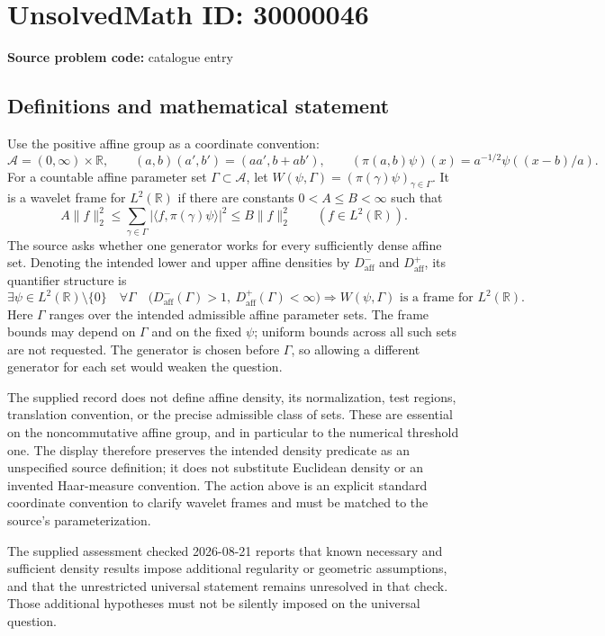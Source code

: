 \documentclass[11pt]{article}
\newcommand{\R}{\mathbb{R}}
\begin{document}
\section*{UnsolvedMath ID: 30000046}
\textbf{Source problem code:} catalogue entry
\subsection{Definitions and mathematical statement}
Use the positive affine group as a coordinate convention:
\[
\mathcal A=(0,\infty)\times\R,\qquad
(a,b)(a',b')=(aa',b+ab'),\qquad
(\pi(a,b)\psi)(x)=a^{-1/2}\psi((x-b)/a).
\]
For a countable affine parameter set \(\Gamma\subset\mathcal A\), let
\(W(\psi,\Gamma)=(\pi(\gamma)\psi)_{\gamma\in\Gamma}\).
It is a wavelet frame for \(L^2(\R)\) if there are constants \(0<A\leq B<\infty\) such that
\[
A\|f\|_2^2\leq\sum_{\gamma\in\Gamma}|\langle f,\pi(\gamma)\psi\rangle|^2
\leq B\|f\|_2^2\qquad(f\in L^2(\R)).
\]
The source asks whether one generator works for every sufficiently dense affine set. Denoting the intended lower and upper affine densities by \(D^-_{\mathrm{aff}}\) and \(D^+_{\mathrm{aff}}\), its quantifier structure is
\[
\exists\psi\in L^2(\R)\setminus\{0\}\quad
\forall\Gamma\quad
\bigl(D^-_{\mathrm{aff}}(\Gamma)>1,\ D^+_{\mathrm{aff}}(\Gamma)<\infty\bigr)
\Longrightarrow W(\psi,\Gamma)\text{ is a frame for }L^2(\R).
\]
Here \(\Gamma\) ranges over the intended admissible affine parameter sets. The frame bounds may depend on \(\Gamma\) and on the fixed \(\psi\); uniform bounds across all such sets are not requested. The generator is chosen before \(\Gamma\), so allowing a different generator for each set would weaken the question.

The supplied record does not define affine density, its normalization, test regions, translation convention, or the precise admissible class of sets. These are essential on the noncommutative affine group, and in particular to the numerical threshold one. The display therefore preserves the intended density predicate as an unspecified source definition; it does not substitute Euclidean density or an invented Haar-measure convention. The action above is an explicit standard coordinate convention to clarify wavelet frames and must be matched to the source's parameterization.

The supplied assessment checked 2026-08-21 reports that known necessary and sufficient density results impose additional regularity or geometric assumptions, and that the unrestricted universal statement remains unresolved in that check. Those additional hypotheses must not be silently imposed on the universal question.
\end{document}
